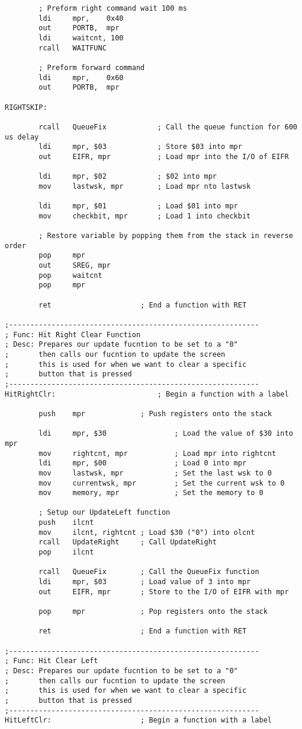 \documentclass[12pt, letterpaper]{article}
\begin{document}
\begin{verbatim}
		; Preform right command wait 100 ms
		ldi		mpr,	0x40
		out		PORTB,	mpr
		ldi		waitcnt, 100
		rcall	WAITFUNC

		; Preform forward command
		ldi		mpr,	0x60
		out		PORTB,	mpr

RIGHTSKIP:

		rcall	QueueFix			; Call the queue function for 600 us delay
		ldi		mpr, $03			; Store $03 into mpr
		out		EIFR, mpr			; Load mpr into the I/O of EIFR

		ldi		mpr, $02			; $02 into mpr
		mov		lastwsk, mpr		; Load mpr nto lastwsk
			
		ldi		mpr, $01			; Load $01 into mpr
		mov		checkbit, mpr		; Load 1 into checkbit

		; Restore variable by popping them from the stack in reverse order
		pop 	mpr
		out 	SREG, mpr
		pop 	waitcnt
		pop 	mpr

		ret						; End a function with RET

;-----------------------------------------------------------
; Func: Hit Right Clear Function
; Desc: Prepares our update fucntion to be set to a "0"
;		then calls our fucntion to update the screen
;		this is used for when we want to clear a specific
;		button that is pressed
;-----------------------------------------------------------
HitRightClr:						; Begin a function with a label

		push	mpr				; Push registers onto the stack

		ldi		mpr, $30				; Load the value of $30 into mpr
		mov		rightcnt, mpr			; Load mpr into rightcnt
		ldi		mpr, $00				; Load 0 into mpr
		mov		lastwsk, mpr			; Set the last wsk to 0
		mov		currentwsk, mpr			; Set the current wsk to 0
		mov		memory, mpr				; Set the memory to 0

		; Setup our UpdateLeft function
		push	ilcnt
		mov		ilcnt, rightcnt	; Load $30 ("0") into olcnt
		rcall	UpdateRight		; Call UpdateRight
		pop		ilcnt

		rcall	QueueFix		; Call the QueueFix function
		ldi		mpr, $03		; Load value of 3 into mpr
		out		EIFR, mpr		; Store to the I/O of EIFR with mpr

		pop		mpr				; Pop registers onto the stack

		ret						; End a function with RET		

;-----------------------------------------------------------
; Func: Hit Clear Left
; Desc: Prepares our update fucntion to be set to a "0"
;		then calls our fucntion to update the screen
;		this is used for when we want to clear a specific
;		button that is pressed
;-----------------------------------------------------------
HitLeftClr:						; Begin a function with a label
		

\end{verbatim}
\end{document}
